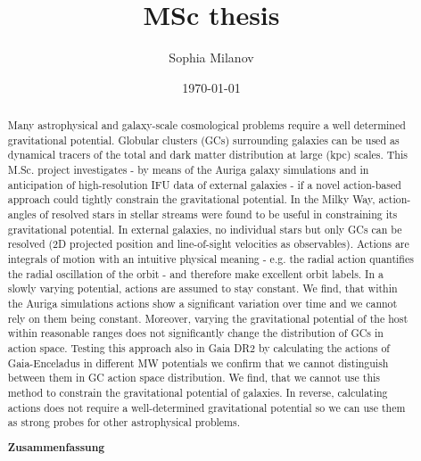 \documentclass[a4paper,12pt,abstracton]{scrartcl}
\title{MSc thesis}
\author{Sophia Milanov}
\date{\today}
\begin{document}
 

\onehalfspacing


\begin{abstract}
\hspace{-12pt}Many astrophysical and galaxy-scale cosmological problems require a well determined gravitational potential. Globular clusters (GCs) surrounding galaxies can be used as dynamical tracers of the total and dark matter distribution at large (kpc) scales. This M.Sc. project investigates - by means of the Auriga galaxy simulations and in anticipation of high-resolution IFU data of external galaxies - if a novel action-based approach could tightly constrain the gravitational potential. In the Milky Way, action-angles of resolved stars in stellar streams were found to be useful in constraining its gravitational potential. In external galaxies, no individual stars but only GCs can be resolved (2D projected position and line-of-sight velocities as observables). Actions are integrals of motion with an intuitive physical meaning - e.g. the radial action quantifies the radial oscillation of the orbit - and therefore make excellent orbit labels. In a slowly varying potential, actions are assumed to stay constant. We find, that within the Auriga simulations actions show a significant variation over time and we cannot rely on them being constant. Moreover, varying the gravitational potential of the host within reasonable ranges does not significantly change the distribution of GCs in action space. Testing this approach also in Gaia DR2 by calculating the actions of Gaia-Enceladus in different MW potentials we confirm that we cannot distinguish between them in GC action space distribution. We find, that we cannot use this method to constrain the gravitational potential of galaxies. In reverse, calculating actions does not require a well-determined gravitational potential so we can use them as strong probes for other astrophysical problems. 

\begin{center}
 \textbf{Zusammenfassung}\end{center}

\hspace{-12pt}\blindtext

\end{abstract}

\newpage
{}
\tableofcontents
\end{document}
